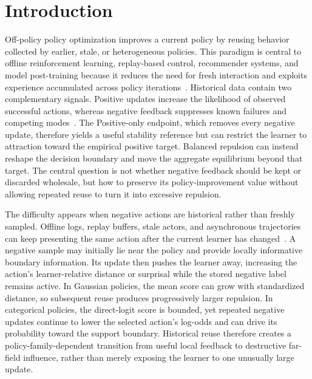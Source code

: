 \section{Introduction}
\label{sec:introduction}

Off-policy policy optimization improves a current policy by reusing behavior collected by earlier, stale, or heterogeneous policies. This paradigm is central to offline reinforcement learning, replay-based control, recommender systems, and model post-training because it reduces the need for fresh interaction and exploits experience accumulated across policy iterations~\cite{levine2020offline,fujimoto2019off}. Historical data contain two complementary signals. Positive updates increase the likelihood of observed successful actions, whereas negative feedback suppresses known failures and competing modes~\cite{peng2019advantage,wang2020critic}. The Positive-only endpoint, which removes every negative update, therefore yields a useful stability reference but can restrict the learner to attraction toward the empirical positive target. Balanced repulsion can instead reshape the decision boundary and move the aggregate equilibrium beyond that target. The central question is not whether negative feedback should be kept or discarded wholesale, but how to preserve its policy-improvement value without allowing repeated reuse to turn it into excessive repulsion.

The difficulty appears when negative actions are historical rather than freshly sampled. Offline logs, replay buffers, stale actors, and asynchronous trajectories can keep presenting the same action after the current learner has changed~\cite{schulman2017proximal,haarnoja2018soft}. A negative sample may initially lie near the policy and provide locally informative boundary information. Its update then pushes the learner away, increasing the action's learner-relative distance or surprisal while the stored negative label remains active. In Gaussian policies, the mean score can grow with standardized distance, so subsequent reuse produces progressively larger repulsion. In categorical policies, the direct-logit score is bounded, yet repeated negative updates continue to lower the selected action's log-odds and can drive its probability toward the support boundary. Historical reuse therefore creates a policy-family-dependent transition from useful local feedback to destructive far-field influence, rather than merely exposing the learner to one unusually large update.

